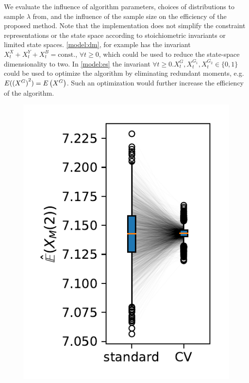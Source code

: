 We evaluate the influence of algorithm parameters, choices of distributions
to sample $\lambda$ from, and the influence of the sample size on the efficiency of
the proposed method.
Note that the implementation does not simplify the constraint representations
or the state space according to stoichiometric invariants or limited
state spaces.
\autoref{model:dm}, for example has the invariant $X^X_t+X^Y_t+X^B_t=\mathrm{const.}$, $\forall t\geq 0$, which
could be used to reduce the state-space dimensionality to two.
In \autoref{model:es} the invariant $\forall t\geq 0.X^G_t,X^{G_1}_t,X^{G_2}_t\in\{0,1\}$ could
be used to optimize the algorithm by eliminating redundant moments, e.g.\ ${E}({(X^G)}^2)={E}\left(X^G\right)$.
Such an optimization would further increase the efficiency of the algorithm.

\begin{figure}[t]
    \centering
    \begin{minipage}{.3\textwidth}
    \centering
    \includegraphics[scale=.6]{gfx/reduction.pdf}
    \end{minipage}
    \hspace{1em}
    \begin{minipage}{.5\textwidth}

\end{minipage}
\end{figure}
